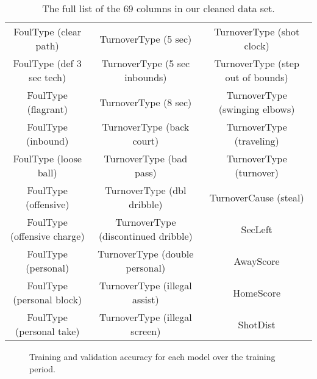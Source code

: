 \begin{table}
\begin{tabular}{ccc}
		FoulType (clear path)       & TurnoverType (5 sec)                & TurnoverType (shot clock)              \\
		FoulType (def 3 sec tech)   & TurnoverType (5 sec inbounds)       & TurnoverType (step out of bounds)      \\
		FoulType (flagrant)         & TurnoverType (8 sec)                & TurnoverType (swinging elbows)         \\
		FoulType (inbound)          & TurnoverType (back court)           & TurnoverType (traveling)               \\
		FoulType (loose ball)       & TurnoverType (bad pass)             & TurnoverType (turnover)                \\
		FoulType (offensive)        & TurnoverType (dbl dribble)          & TurnoverCause (steal)                  \\
		FoulType (offensive charge) & TurnoverType (discontinued dribble) & SecLeft                                \\
		FoulType (personal)         & TurnoverType (double personal)      & AwayScore                              \\
		FoulType (personal block)   & TurnoverType (illegal assist)       & HomeScore                              \\
		FoulType (personal take)    & TurnoverType (illegal screen)       & ShotDist
	\end{tabular}
	\caption{The full list of the 69 columns in our cleaned data set.}
	\label{tbl:list-of-columns}
\end{table}

\begin{figure}
	\centering
	
	\caption{Training and validation accuracy for each model over the training period.}
	\label{fig:training-curves}
\end{figure}
